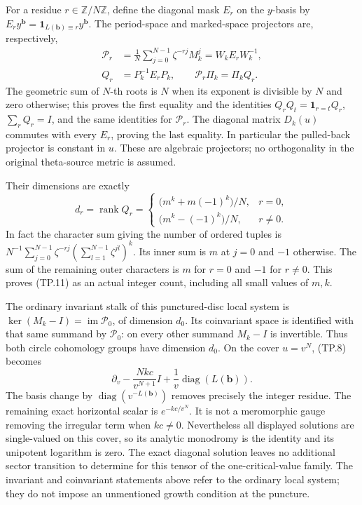For a residue \(r\in\mathbb Z/N\mathbb Z\), define the diagonal
mask \(E_r\) on the \(y\)-basis by
\(E_r y^{\mathbf b}=\mathbf1_{L(\mathbf b)\equiv r}y^{\mathbf b}\).
The period-space and marked-space projectors are, respectively,
\[
 \begin{split}
 \mathcal P_r&=\frac1N\sum_{j=0}^{N-1}\zeta^{-rj}M_k^j
             =W_kE_rW_k^{-1},\\
 Q_r&=P_k^{-1}E_rP_k,\qquad
       \mathcal P_r\Pi_k=\Pi_k Q_r .
 \end{split}
 \tag{TP.10}\label{eq:tp-projector}
\]
The geometric sum of \(N\)-th roots is \(N\) when its exponent
is divisible by \(N\) and zero otherwise; this proves the first
equality and the identities
\(Q_rQ_t=\mathbf1_{r=t}Q_r\), \(\sum_rQ_r=I\), and the same
identities for \(\mathcal P_r\). The diagonal matrix \(D_k(u)\)
commutes with every \(E_r\), proving the last equality. In
particular the pulled-back projector is constant in \(u\).
These are algebraic projectors; no orthogonality in the original
theta-source metric is assumed.

Their dimensions are exactly
\[
 d_r=\operatorname{rank}Q_r
  =\begin{cases}
  \bigl(m^k+m(-1)^k\bigr)/N,&r=0,\\
  \bigl(m^k-(-1)^k\bigr)/N,&r\ne0.
  \end{cases}
 \tag{TP.11}\label{eq:tp-count}
\]
In fact the character sum giving the number of ordered tuples is
\(N^{-1}\sum_{j=0}^{N-1}\zeta^{-rj}
(\sum_{l=1}^{N-1}\zeta^{jl})^k\). Its inner sum is \(m\) at
\(j=0\) and \(-1\) otherwise. The sum of the remaining outer
characters is \(m\) for \(r=0\) and \(-1\) for \(r\ne0\).
This proves (TP.11) as an actual integer count, including all
small values of \(m,k\).

The ordinary invariant stalk of this punctured-disc local system
is \(\ker(M_k-I)=\operatorname{im}\mathcal P_0\), of dimension
\(d_0\). Its coinvariant space is identified with that same
summand by \(\mathcal P_0\): on every other summand \(M_k-I\)
is invertible. Thus both circle cohomology groups have dimension
\(d_0\). On the cover \(u=v^N\), (TP.8) becomes
\[
 \partial_v-\frac{Nkc}{v^{N+1}}I
       +\frac1v\operatorname{diag}(L(\mathbf b)).
 \tag{TP.12}\label{eq:tp-cover}
\]
The basis change by \(\operatorname{diag}(v^{-L(\mathbf b)})\)
removes precisely the integer residue. The remaining exact
horizontal scalar is \(e^{-kc/v^N}\). It is not a meromorphic
gauge removing the irregular term when \(kc\ne0\).
Nevertheless all displayed solutions are single-valued on this
cover, so its analytic monodromy is the identity and its
unipotent logarithm is zero. The exact diagonal solution leaves
no additional sector transition to determine for this tensor
of the one-critical-value family. The invariant and coinvariant
statements above refer to the ordinary local system; they do not
impose an unmentioned growth condition at the puncture.

